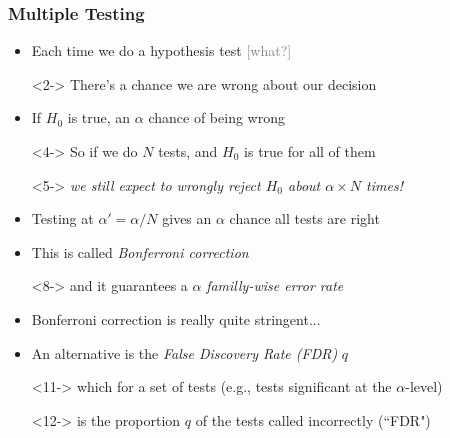 \documentclass[xcolor={dvipsnames}]{beamer}
\begin{document}
\frame
{
\frametitle{Multiple Testing}

\begin{itemize}
\item Each time we do a hypothesis test \textcolor{gray}{[what?]}
\item[]<2-> There's a chance we are wrong about our decision
\item<3-> If $H_0$ is true, an $\alpha$ chance of being wrong
\item[]<4-> So if we do $N$ tests, and $H_0$ is true for all of them
\item[]<5-> \emph{we still expect to wrongly reject $H_0$ about $\alpha \times N$ times!}
\item<6-> Testing at $\alpha' = \alpha/N$ gives an $\alpha$ chance all tests are right
\item<7-> This is called \emph{Bonferroni correction} 
\item[]<8-> and it guarantees a $\alpha$ \emph{familly-wise error rate} 
\item[]
\item<9-> Bonferroni correction is really quite stringent... 
\item[]
\item<10-> An alternative is the \emph{False Discovery Rate (FDR)} $q$
\item[]<11-> which for a set of tests (e.g., tests significant at the $\alpha$-level)
\item[]<12-> is the proportion $q$ of the tests called incorrectly (``FDR")
\end{itemize}

}


\end{document}
